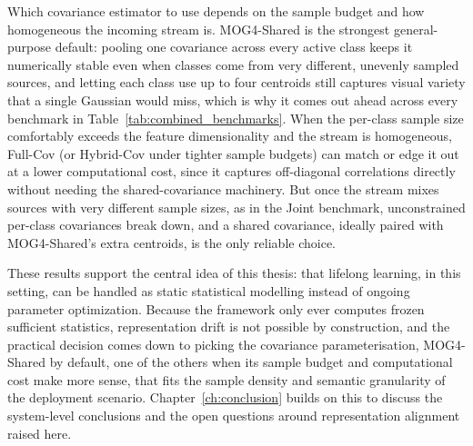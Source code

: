Which covariance estimator to use depends on the sample budget and how homogeneous the incoming stream is. MOG4-Shared is the strongest general-purpose default: pooling one covariance across every active class keeps it numerically stable even when classes come from very different, unevenly sampled sources, and letting each class use up to four centroids still captures visual variety that a single Gaussian would miss, which is why it comes out ahead across every benchmark in Table~\ref{tab:combined_benchmarks}. When the per-class sample size comfortably exceeds the feature dimensionality and the stream is homogeneous, Full-Cov (or Hybrid-Cov under tighter sample budgets) can match or edge it out at a lower computational cost, since it captures off-diagonal correlations directly without needing the shared-covariance machinery. But once the stream mixes sources with very different sample sizes, as in the Joint benchmark, unconstrained per-class covariances break down, and a shared covariance, ideally paired with MOG4-Shared's extra centroids, is the only reliable choice.

These results support the central idea of this thesis: that lifelong learning, in this setting, can be handled as static statistical modelling instead of ongoing parameter optimization. Because the framework only ever computes frozen sufficient statistics, representation drift is not possible by construction, and the practical decision comes down to picking the covariance parameterisation, MOG4-Shared by default, one of the others when its sample budget and computational cost make more sense, that fits the sample density and semantic granularity of the deployment scenario. Chapter~\ref{ch:conclusion} builds on this to discuss the system-level conclusions and the open questions around representation alignment raised here.